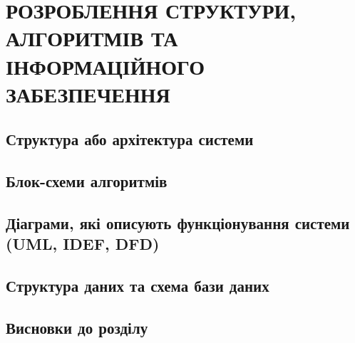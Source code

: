 \chapter{РОЗРОБЛЕННЯ СТРУКТУРИ, АЛГОРИТМІВ ТА ІНФОРМАЦІЙНОГО ЗАБЕЗПЕЧЕННЯ}

\section{Структура або архітектура системи}
\section{Блок-схеми алгоритмів}
\section{Діаграми, які описують функціонування системи (UML, IDEF, DFD)}
\section{Структура даних та схема бази даних}
\section{Висновки до розділу}
